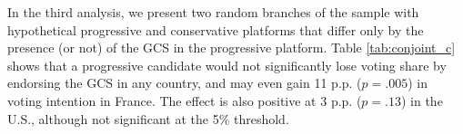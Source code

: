 \documentclass{nature}
\begin{document}
In the third analysis, we present two random branches of the sample with hypothetical progressive and conservative platforms that differ only by the presence (or not) of the GCS in the progressive platform. Table \ref{tab:conjoint_c} shows that a progressive candidate would not significantly lose voting share by endorsing the GCS in any country, and may even gain 11 p.p. ($p = .005$) in voting intention in France. The effect is also positive at 3 p.p. ($p = .13$) in the U.S., although not significant at the 5\% threshold. %

\end{document}
